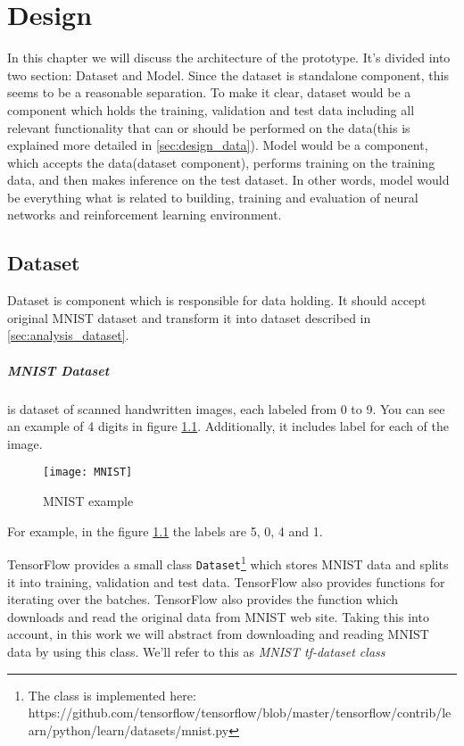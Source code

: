 \chapter{Design}
In this chapter we will discuss the architecture of the prototype.
It's divided into two section: Dataset and Model. Since
the dataset is standalone component, this seems to be
a reasonable separation. To make it clear, dataset would be a component
which holds the training, validation and test data including all relevant
functionality that can or should be performed on the
data(this is explained more detailed in \autoref{sec:design_data}).
Model would be a component, which accepts the data(dataset component), performs
training on the training data, and then makes inference on the test dataset.
In other words, model would be everything what is related to building,
training and evaluation of neural networks and reinforcement learning environment.



\section{Dataset}
\label{sec:design_data}

Dataset is component which is responsible for data holding. It should
accept original MNIST dataset and transform it into dataset described
in \autoref{sec:analysis_dataset}.

\paragraph{MNIST Dataset} is dataset of scanned handwritten images, each labeled
from 0 to 9. You can see an example of 4 digits in figure \ref{fig:mnist}.
Additionally, it includes label for each of the image.

\begin{figure}[h!]
	\texttt{[image: MNIST]}
	\caption{MNIST example}
	\label{fig:mnist}
\end{figure}

For example, in the figure \ref{fig:mnist} the labels are 5, 0, 4 and 1.

TensorFlow provides a small class \lstinline{Dataset}\footnote{
The class is implemented here: https://github.com/tensorflow/tensorflow/blob/master/tensorflow/contrib/learn/python/learn/datasets/mnist.py
} which stores MNIST data and splits it into training,
validation and test data. TensorFlow also provides functions for iterating
over the batches.
TensorFlow also provides the function which downloads and read the original data
from MNIST web site. Taking this into account, in this work we will abstract from
downloading and reading MNIST data by using this class. We'll refer
to this as \emph{MNIST tf-dataset class}

